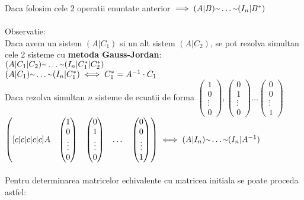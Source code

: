 \documentclass{article}
\newcommand{\mytilde}{\raise.17ex\hbox{$\scriptstyle\mathtt{\sim}$}}
\begin{document}
        Daca folosim cele 2 operatii enuntate anterior $\implies (A|B) \mytilde \dots \mytilde (I_n|B^*)$\\ \\
        Observatie:\\
        Daca avem un sistem $(A|C_1)$ si un alt sistem $(A|C_2)$, se pot rezolva simultan cele 2 sisteme cu \textbf{metoda Gauss-Jordan}:\\
        $(A|C_1|C_2)\mytilde \dots \mytilde (I_n|C_1^*|C_2^*)$\\
        $(A|C_1) \mytilde \dots \mytilde (I_n|C_1^*) \iff C_1^* = A^{-1} \cdot C_1$\\
        Daca rezolva simultan $n$ sisteme de ecuatii de forma $\begin{pmatrix} 1\\0\\ \vdots\\ 0 \end{pmatrix}, \begin{pmatrix} 0\\1\\ \vdots\\ 0 \end{pmatrix}
            \dots \begin{pmatrix} 0\\0\\ \vdots\\ 1 \end{pmatrix}$\\
                $\begin{pmatrix}[c|c|c|c|c] A&\begin{pmatrix} 1\\0\\ \vdots\\ 0 \end{pmatrix}& \begin{pmatrix} 0\\1\\ \vdots\\ 0 \end{pmatrix}& \dots &
                    \begin{pmatrix}0\\0\\ \vdots\\ 1\end{pmatrix}\end{pmatrix} \iff (A|I_n) \mytilde \dots \mytilde (I_n|A^{-1})$ \\ \\
        Pentru determinarea matricelor echivalente cu matricea initiala se poate proceda astfel:
\end{document}
